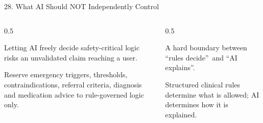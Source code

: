 \documentclass[9pt,aspectratio=169]{beamer}
\begin{document}
\begin{frame}{28. What AI Should NOT Independently Control}
\begin{columns}[T,onlytextwidth]
\begin{column}{0.5\textwidth}
\begin{tcolorbox}[colback=blue!7,colframe=blue!55!black,title=\textbf{Motivation},boxrule=0.6pt,arc=1mm,left=5pt,right=5pt,top=3pt,bottom=3pt,fonttitle=\small]
\footnotesize Letting AI freely decide safety-critical logic risks an unvalidated claim reaching a user.
\end{tcolorbox}
\vspace{5pt}
\begin{tcolorbox}[colback=teal!7,colframe=teal!55!black,title=\textbf{Method},boxrule=0.6pt,arc=1mm,left=5pt,right=5pt,top=3pt,bottom=3pt,fonttitle=\small]
\footnotesize Reserve emergency triggers, thresholds, contraindications, referral criteria, diagnosis and medication advice to rule-governed logic only.
\end{tcolorbox}
\end{column}
\begin{column}{0.5\textwidth}
\begin{tcolorbox}[colback=green!8,colframe=green!45!black,title=\textbf{Result},boxrule=0.6pt,arc=1mm,left=5pt,right=5pt,top=3pt,bottom=3pt,fonttitle=\small]
\footnotesize A hard boundary between \textquotedblleft rules decide\textquotedblright\ and \textquotedblleft AI explains\textquotedblright.
\end{tcolorbox}
\vspace{5pt}
\begin{tcolorbox}[colback=orange!10,colframe=orange!65!black,title=\textbf{Conclusion},boxrule=0.6pt,arc=1mm,left=5pt,right=5pt,top=3pt,bottom=3pt,fonttitle=\small]
\footnotesize Structured clinical rules determine what is allowed; AI determines how it is explained.
\end{tcolorbox}
\end{column}
\end{columns}
\end{frame}
\end{document}
